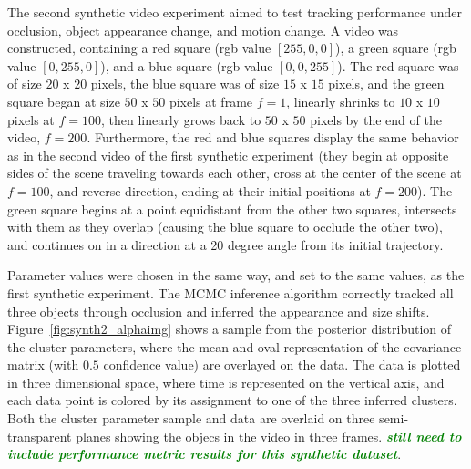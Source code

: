 \documentclass[smallcondensed, final]{svjour3}
\newcommand{\willie}[1]{\textcolor{green}{\textsf{\emph{\textbf{\textcolor{green}{#1}}}}}}
\begin{document}
The second synthetic video experiment aimed to test tracking performance under occlusion, object appearance change, and motion change. A video was constructed, containing a red square (rgb value $[255,0,0]$), a green square (rgb value $[0,255,0]$), and a blue square (rgb value $[0,0,255]$). The red square was of size $20$ x $20$ pixels, the blue square was of size $15$ x $15$ pixels, and the green square began at size $50$ x $50$ pixels at frame $f=1$, linearly shrinks to $10$ x $10$ pixels at $f=100$, then linearly grows back to $50$ x $50$ pixels by the end of the video, $f=200$. Furthermore, the red and blue squares display the same behavior as in the second video of the first synthetic experiment (they begin at opposite sides of the scene traveling towards each other, cross at the center of the scene at $f=100$, and reverse direction, ending at their initial positions at $f=200$). The green square begins at a point equidistant from the other two squares, intersects with them as they overlap (causing the blue square to occlude the other two), and continues on in a direction at a 20 degree angle from its initial trajectory.

Parameter values were chosen in the same way, and set to the same values, as the first synthetic experiment. The MCMC inference algorithm correctly tracked all three objects through occlusion and inferred the appearance and size shifts. Figure~\ref{fig:synth2_alphaimg} shows a sample from the posterior distribution of the cluster parameters, where the mean and oval representation of the covariance matrix (with $0.5$ confidence value) are overlayed on the data. The data is plotted in three dimensional space, where time is represented on the vertical axis, and each data point is colored by its assignment to one of the three inferred clusters. Both the cluster parameter sample and data are overlaid on three semi-transparent planes showing the objecs in the video in three frames. \willie{still need to include performance metric results for this synthetic dataset}.

\end{document}
